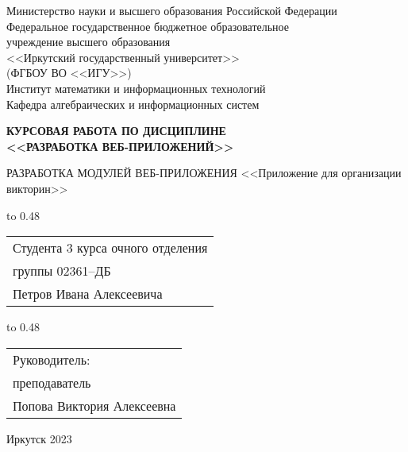 \thispagestyle{empty}
\begin{center}
Министерство науки и высшего образования Российской Федерации\\
Федеральное государственное бюджетное образовательное\\
учреждение высшего образования\\
<<Иркутский государственный университет>>\\
(ФГБОУ ВО <<ИГУ>>)\\
Институт математики и информационных технологий\\
Кафедра алгебраических и информационных систем
\end{center}

\vspace{2.7cm}

\begin{center}
{\bf 
КУРСОВАЯ РАБОТА ПО ДИСЦИПЛИНЕ \\ <<РАЗРАБОТКА ВЕБ-ПРИЛОЖЕНИЙ>>\\[1mm]
} 

\vspace{0.9cm}

{
	РАЗРАБОТКА МОДУЛЕЙ ВЕБ-ПРИЛОЖЕНИЯ <<Приложение для организации викторин>> 
}
\end{center}

\vspace{3.8cm}

{
\noindent\hbox to 0.48\textwidth {%
	\mbox{ } \hfil} %
\begin{tabular}[t]{l}
	Студента 3 курса очного отделения\\
	группы 02361--ДБ\\
	Петров Ивана Алексеевича\\		
\end{tabular}		
}

\vspace{0.8cm}

{
\noindent\hbox to 0.48\textwidth {%
	\mbox{ } \hfil} %
\begin{tabular}[t]{l}
	Руководитель:\\ преподаватель\\
	Попова Виктория Алексеевна
\end{tabular}		
}

\vspace{0.8cm}



\vfill 
\noindent
\begin{minipage}{\textwidth}
\centering	 Иркутск 2023
\end{minipage}